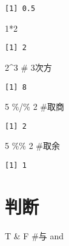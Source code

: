 \documentclass[
  letterpaper,
  DIV=11,
  numbers=noendperiod]{scrreprt}
\newenvironment{Shaded}{\begin{snugshade}}{\end{snugshade}}
\newcommand{\CommentTok}[1]{\textcolor[rgb]{0.37,0.37,0.37}{#1}}
\newcommand{\DecValTok}[1]{\textcolor[rgb]{0.68,0.00,0.00}{#1}}
\newcommand{\NormalTok}[1]{\textcolor[rgb]{0.00,0.23,0.31}{#1}}
\newcommand{\SpecialCharTok}[1]{\textcolor[rgb]{0.37,0.37,0.37}{#1}}
\begin{document}
\begin{verbatim}
[1] 0.5
\end{verbatim}

\begin{Shaded}
\begin{Highlighting}[]
\DecValTok{1}\SpecialCharTok{*}\DecValTok{2}
\end{Highlighting}
\end{Shaded}

\begin{verbatim}
[1] 2
\end{verbatim}

\begin{Shaded}
\begin{Highlighting}[]
\DecValTok{2}\SpecialCharTok{\^{}}\DecValTok{3} \CommentTok{\# 3次方}
\end{Highlighting}
\end{Shaded}

\begin{verbatim}
[1] 8
\end{verbatim}

\begin{Shaded}
\begin{Highlighting}[]
\DecValTok{5} \SpecialCharTok{\%/\%} \DecValTok{2} \CommentTok{\#取商}
\end{Highlighting}
\end{Shaded}

\begin{verbatim}
[1] 2
\end{verbatim}

\begin{Shaded}
\begin{Highlighting}[]
\DecValTok{5} \SpecialCharTok{\%\%} \DecValTok{2} \CommentTok{\#取余}
\end{Highlighting}
\end{Shaded}

\begin{verbatim}
[1] 1
\end{verbatim}

\section{判断}\label{ux5224ux65ad}

\begin{Shaded}
\begin{Highlighting}[]
\NormalTok{T }\SpecialCharTok{\&}\NormalTok{ F  }\CommentTok{\#与 and}
\end{Highlighting}
\end{Shaded}
\end{document}

